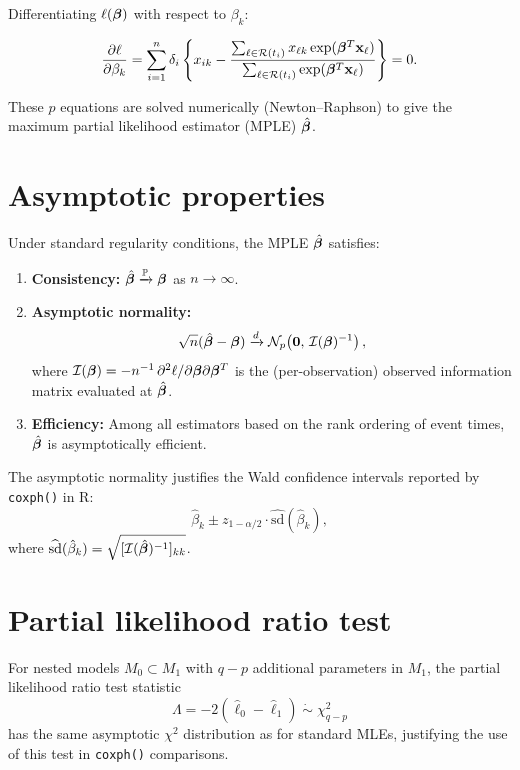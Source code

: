 Differentiating $\ell(\boldsymbol{\beta})$ with respect to $\beta_k$:

\[
\frac{\partial \ell}{\partial \beta_k} = \sum_{i=1}^n \delta_i \left\{x_{ik} - \frac{\sum_{\ell \in \mathcal{R}(t_i)} x_{\ell k} \exp(\boldsymbol{\beta}^T\mathbf{x}_\ell)}{\sum_{\ell \in \mathcal{R}(t_i)} \exp(\boldsymbol{\beta}^T\mathbf{x}_\ell)}\right\} = 0.
\]

These $p$ equations are solved numerically (Newton--Raphson) to give the maximum partial likelihood estimator (MPLE) $\hat{\boldsymbol{\beta}}$.

\section*{Asymptotic properties}

\begin{theorem}
Under standard regularity conditions, the MPLE $\hat{\boldsymbol{\beta}}$ satisfies:
\begin{enumerate}
\item \textbf{Consistency:} $\hat{\boldsymbol{\beta}} \xrightarrow{\mathbb{P}} \boldsymbol{\beta}$ as $n \to \infty$.
\item \textbf{Asymptotic normality:}
\[
\sqrt{n}(\hat{\boldsymbol{\beta}} - \boldsymbol{\beta}) \xrightarrow{d} \mathcal{N}_p\!\left(\mathbf{0},\, \mathcal{I}(\boldsymbol{\beta})^{-1}\right),
\]
where $\mathcal{I}(\boldsymbol{\beta}) = -n^{-1}\,\partial^2\ell/\partial\boldsymbol{\beta}\partial\boldsymbol{\beta}^T$ is the (per-observation) observed information matrix evaluated at $\hat{\boldsymbol{\beta}}$.
\item \textbf{Efficiency:} Among all estimators based on the rank ordering of event times, $\hat{\boldsymbol{\beta}}$ is asymptotically efficient.
\end{enumerate}
\end{theorem}

The asymptotic normality justifies the Wald confidence intervals reported by \texttt{coxph()} in R:
\[
\hat\beta_k \pm z_{1-\alpha/2} \cdot \widehat{\mathrm{sd}}(\hat\beta_k),
\]
where $\widehat{\mathrm{sd}}(\hat\beta_k) = \sqrt{[\mathcal{I}(\hat{\boldsymbol{\beta}})^{-1}]_{kk}}$.

\section*{Partial likelihood ratio test}

For nested models $M_0 \subset M_1$ with $q - p$ additional parameters in $M_1$, the partial likelihood ratio test statistic
\[
\Lambda = -2(\hat\ell_0 - \hat\ell_1) \;\dot\sim\; \chi^2_{q-p}
\]
has the same asymptotic $\chi^2$ distribution as for standard MLEs, justifying the use of this test in \texttt{coxph()} comparisons.


